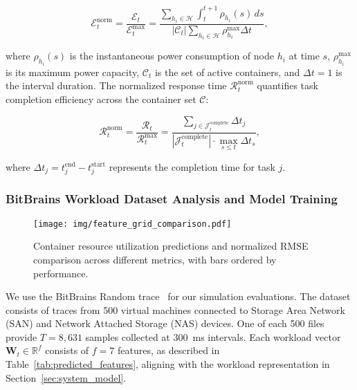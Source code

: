 \documentclass{ieeetmlcn}
\begin{document}
\begin{equation}
\label{eq:energy_consumption}
\mathcal{E}_t^{\text{norm}} = \frac{\mathcal{E}_t}{\mathcal{E}_t^{\text{max}}} = \frac{\sum_{h_i \in \mathcal{H}} \int_{t}^{t+1} \rho_{h_i}(s) \, ds}{|\mathcal{C}_t| \sum_{h_i \in \mathcal{H}} \rho_{h_i}^{\text{max}} \Delta t},
\end{equation}

\noindent where $\rho_{h_i}(s)$ is the instantaneous power consumption of node $h_i$ at time $s$, $\rho_{h_i}^{\text{max}}$ is its maximum power capacity, $\mathcal{C}_t$ is the set of active containers, and $\Delta t = 1$ is the interval duration. The normalized response time $\mathcal{R}_t^{\text{norm}}$ quantifies task completion efficiency across the container set $\mathcal{C}$:

\begin{equation}
\label{eq:response_time}
\mathcal{R}_t^{\text{norm}} = \frac{\mathcal{R}_t}{\mathcal{R}_t^{\text{max}}} = \frac{\sum_{j \in \mathcal{J}_t^{\text{complete}}} \Delta t_j}
{|\mathcal{J}_t^{\text{complete}}| \cdot \max_{s \leq t} \Delta t_s},
\end{equation}

\noindent where $\Delta t_j = t_j^{\text{end}} - t_j^{\text{start}}$ represents the completion time for task $j$.

\subsubsection{BitBrains Workload Dataset Analysis and Model Training}

\begin{figure*}[htbp]  
\centering
\texttt{[image: img/feature\_grid\_comparison.pdf]}
\caption{Container resource utilization predictions and normalized RMSE comparison across different metrics, with bars ordered by performance.}
\label{fig:feature_grid_comparison}
\end{figure*}

We use the BitBrains Random trace~\cite{BitbrainsDS} for our simulation evaluations. The dataset consists of traces from 500 virtual machines connected to Storage Area Network (SAN) and Network Attached Storage (NAS) devices. One of each 500 files provide $T = 8,631$ samples collected at \SI{300}{\milli\second} intervals. Each workload vector $\mathbf{W}_t \in \mathbb{R}^{f}$ consists of $f = 7$ features, as described in Table~\ref{tab:predicted_features}, aligning with the workload representation in Section~\ref{sec:system_model}.
\end{document}
